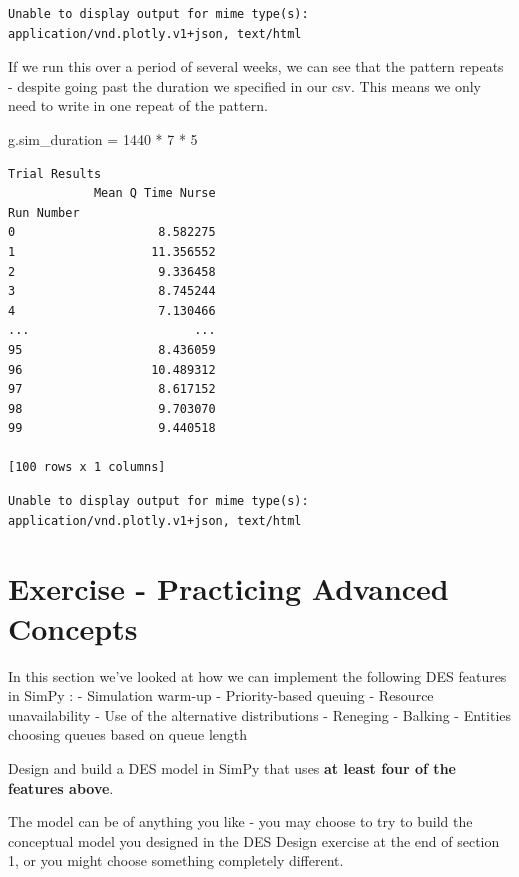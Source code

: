 \documentclass[
  letterpaper,
  DIV=11,
  numbers=noendperiod]{scrreprt}
\newenvironment{Shaded}{\begin{snugshade}}{\end{snugshade}}
\newcommand{\DecValTok}[1]{\textcolor[rgb]{0.68,0.00,0.00}{#1}}
\newcommand{\NormalTok}[1]{\textcolor[rgb]{0.00,0.23,0.31}{#1}}
\newcommand{\OperatorTok}[1]{\textcolor[rgb]{0.37,0.37,0.37}{#1}}
\begin{document}
\begin{verbatim}
Unable to display output for mime type(s): application/vnd.plotly.v1+json, text/html
\end{verbatim}

If we run this over a period of several weeks, we can see that the
pattern repeats - despite going past the duration we specified in our
csv. This means we only need to write in one repeat of the pattern.

\begin{Shaded}
\begin{Highlighting}[]
\NormalTok{g.sim\_duration }\OperatorTok{=} \DecValTok{1440} \OperatorTok{*} \DecValTok{7} \OperatorTok{*} \DecValTok{5}
\end{Highlighting}
\end{Shaded}

\begin{verbatim}
Trial Results
            Mean Q Time Nurse
Run Number                   
0                    8.582275
1                   11.356552
2                    9.336458
3                    8.745244
4                    7.130466
...                       ...
95                   8.436059
96                  10.489312
97                   8.617152
98                   9.703070
99                   9.440518

[100 rows x 1 columns]
\end{verbatim}

\begin{verbatim}
Unable to display output for mime type(s): application/vnd.plotly.v1+json, text/html
\end{verbatim}

\chapter{Exercise - Practicing Advanced
Concepts}\label{exercise---practicing-advanced-concepts}

In this section we've looked at how we can implement the following DES
features in SimPy : - Simulation warm-up - Priority-based queuing -
Resource unavailability - Use of the alternative distributions -
Reneging - Balking - Entities choosing queues based on queue length

Design and build a DES model in SimPy that uses \textbf{at least four of
the features above}.

The model can be of anything you like - you may choose to try to build
the conceptual model you designed in the DES Design exercise at the end
of section 1, or you might choose something completely different.
\end{document}

